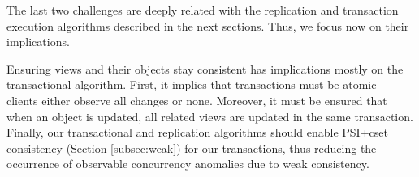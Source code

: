 
The last two challenges are deeply related with the replication and transaction execution algorithms described in the next sections. 
Thus, we focus now on their implications.

Ensuring views and their objects stay consistent has implications mostly on the transactional algorithm.
First, it implies that transactions must be atomic - clients either observe all changes or none.
Moreover, it must be ensured that when an object is updated, all related views are updated in the same transaction.
Finally, our transactional and replication algorithms should enable PSI+cset consistency (Section \ref{subsec:weak}) for our transactions, thus reducing the occurrence of observable concurrency anomalies due to weak consistency. 

